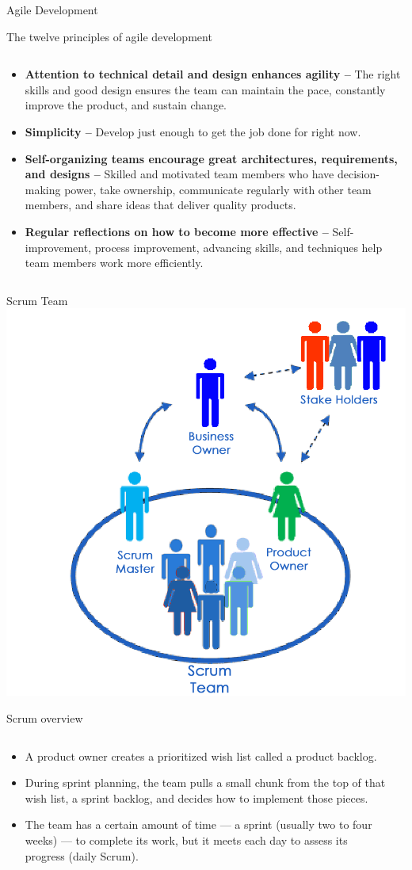 \documentclass[final,hyperref={pdfpagelabels=false}]{beamer}
\begin{document}
\begin{frame}{Agile Development}
\begin{block}{\large The twelve principles of agile development}
\begin{columns}[t]
\begin{column}{.48\linewidth}
\begin{itemize}
                \item \textbf{Attention to technical detail and design enhances agility – } The right skills and good design ensures the team can maintain the pace, constantly improve the product, and sustain change.
                \item \textbf{Simplicity – }Develop just enough to get the job done for right now.
                \item \textbf{Self-organizing teams encourage great architectures, requirements, and designs –} Skilled and motivated team members who have decision-making power, take ownership, communicate regularly with other team members, and share ideas that deliver quality products.
                \item \textbf{Regular reflections on how to become more effective –} Self-improvement, process improvement, advancing skills, and techniques help team members work more efficiently.
            \end{itemize}
        \end{column}
    \end{columns}
    \end{block}
     \begin{block}{\large Scrum Team}
      \centering
        \includegraphics[width=.3\linewidth]{scrum}
    \end{block}  
     \begin{block}{Scrum overview}  
    \begin{columns}[t]
      \begin{column}{.48\linewidth}
        
          \begin{itemize}
                \item A product owner creates a prioritized wish list called a product backlog.
                \item During sprint planning, the team pulls a small chunk from the top of that wish list, a sprint backlog, and decides how to implement those pieces.
                \item The team has a certain amount of time — a sprint (usually two to four weeks) — to complete its work, but it meets each day to assess its progress (daily Scrum).
          \end{itemize}
      \end{column}
      \begin{column}{.48\linewidth}


\end{column}
\end{columns}
\end{block}
\end{frame}
\end{document}
